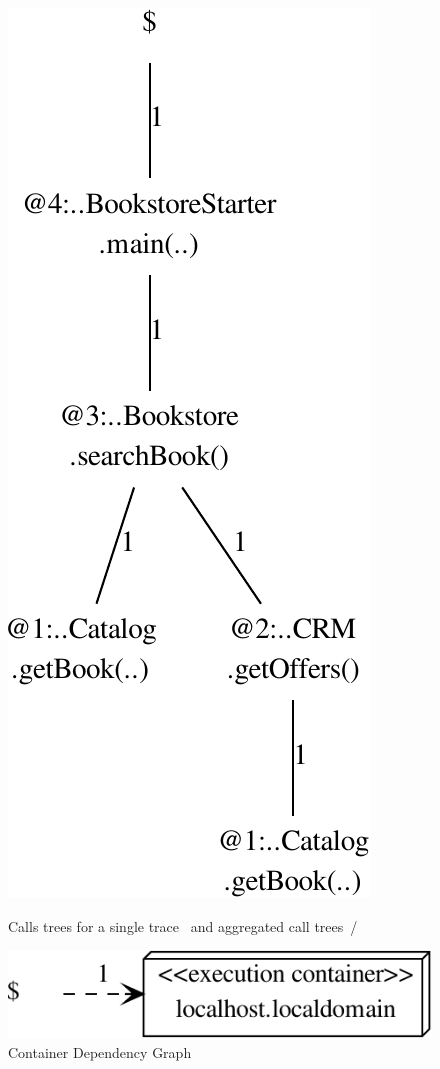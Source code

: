 \begin{figure}[H]
{	\quad\quad\quad \includegraphics[scale=0.4]{images/aggregatedAssemblyCallTree-crop}\quad\quad\quad %
	}%
	\caption{Calls trees for a single trace~ and aggregated call %
	trees~/}
	\end{figure}

\newpage

	\begin{figure}[H]
		\centering
		\includegraphics[scale=0.45]{images/containerDependencyGraph-crop}
		\caption{Container Dependency Graph}
	\end{figure}  

